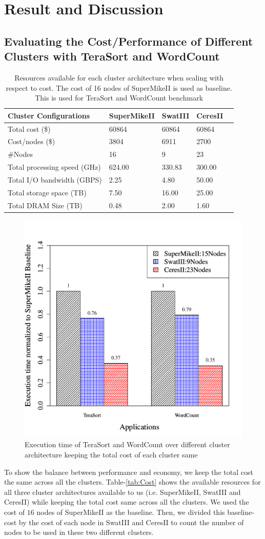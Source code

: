 \documentclass[journal]{IEEEtran}
\begin{document}
\section{Result and Discussion} \label{sec:Result}
\subsection{Evaluating the Cost/Performance of Different Clusters with TeraSort and WordCount}
\begin{table}[!t]
\caption{Resources available for each cluster architecture when scaling with respect to cost. The cost of 16 nodes of SuperMikeII is used as baseline. This is used for TeraSort and WordCount benchmark}
\label{tab:ScalingCost}
\label{fig:perf}
\centering
\begin{tabular}{|p{2.5cm}|p{1.5cm}|p{1.5cm}|p{1.5cm}|p{1.5cm}|} \hline
Cluster Configurations & SuperMikeII & SwatIII & CeresII\\ \hline
Total cost (\$) & 60864 & 60864 & 60864\\ \hline
Cost/nodes (\$) & 3804 & 6911 & 2700\\ \hline
\#Nodes & 16 & 9 & 23\\ \hline
Total processing speed (GHz) & 624.00 & 330.83 & 300.00\\ \hline
Total I/O bandwidth (GBPS) & 2.25 & 4.80 & 50.00\\ \hline
Total storage space (TB) & 7.50 & 16.00 & 25.00\\ \hline
Total DRAM Size (TB) & 0.48 & 2.00 & 1.60\\ \hline
\end{tabular}
\end{table}
\begin{figure}[!t]
\centering
\includegraphics[width=.5\textwidth]{Figures/PerformanceFigures/execTimeTnW.pdf}
\caption{Execution time of TeraSort and WordCount over different cluster architecture keeping the total cost of each cluster same}
\end{figure}
To show the balance between performance and economy, we keep the total cost the same across all the clusters. Table-\ref{tab:Cost} shows the available resources for all three cluster architectures available to us (i.e. SuperMikeII, SwatIII and CeresII) while keeping the total cost same across all the clusters. We used the cost of $16$ nodes of SuperMikeII as the baseline. Then, we divided this baseline-cost by the cost of each node in SwatIII and CeresII to count the number of nodes to be used in these two different clusters.
\end{document}
